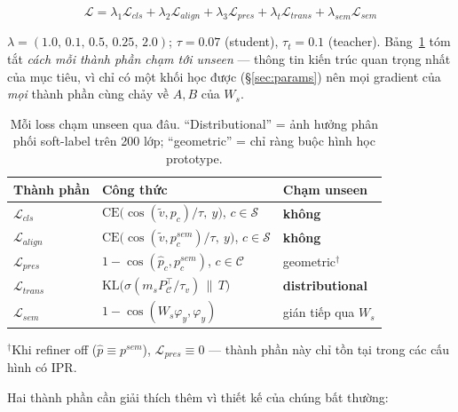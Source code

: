 \documentclass[10pt,twocolumn,letterpaper]{article}
\newcommand{\Seen}{\mathcal{S}}
\newcommand{\All}{\mathcal{C}}
\newcommand{\vtilde}{\tilde{v}}
\newcommand{\phat}{\hat{p}}
\begin{document}
\begin{equation}
\mathcal{L} = \lambda_1\mathcal{L}_{cls}
+ \lambda_2\mathcal{L}_{align}
+ \lambda_3\mathcal{L}_{pres}
+ \lambda_{t}\mathcal{L}_{trans}
+ \lambda_{sem}\mathcal{L}_{sem}
\label{eq:total}
\end{equation}

$\lambda = (1.0,\,0.1,\,0.5,\,0.25,\,2.0)$; $\tau{=}0.07$ (student), $\tau_t{=}0.1$ (teacher). Bảng~\ref{tab:loss-contact} tóm tắt \emph{cách mỗi thành phần chạm tới unseen} — thông tin kiến trúc quan trọng nhất của mục tiêu, vì chỉ có một khối học được (§\ref{sec:params}) nên mọi gradient của \emph{mọi} thành phần cùng chảy về $A,B$ của $W_s$.

\begin{table}[t]
\centering
\caption{Mỗi loss chạm unseen qua đâu. ``Distributional'' = ảnh hưởng phân phối soft-label trên 200 lớp; ``geometric'' = chỉ ràng buộc hình học prototype.}
\label{tab:loss-contact}
\small
\begin{tabular}{lll}
\toprule
Thành phần & Công thức & Chạm unseen \\
\midrule
$\mathcal{L}_{cls}$ & $\mathrm{CE}\big(\cos(\vtilde,p_c)/\tau,\ y\big)$, $c\in\Seen$ & \textbf{không} \\
$\mathcal{L}_{align}$ & $\mathrm{CE}\big(\cos(\vtilde,p^{sem}_c)/\tau,\ y\big)$, $c\in\Seen$ & \textbf{không} \\
$\mathcal{L}_{pres}$ & $1-\cos(\phat_c, p^{sem}_c)$, $c\in\All$ & geometric$^{\dagger}$ \\
$\mathcal{L}_{trans}$ & $\mathrm{KL}\big(\sigma(m_s P_{\All}^{\top}/\tau_v)\,\big\|\,T\big)$ & \textbf{distributional} \\
$\mathcal{L}_{sem}$ & $1-\cos(W_s\varphi_y,\varphi_y)$ & gián tiếp qua $W_s$ \\
\bottomrule
\end{tabular}

\raggedright\footnotesize $^{\dagger}$Khi refiner off ($\phat\equiv p^{sem}$), $\mathcal L_{pres}\equiv 0$ — thành phần này chỉ tồn tại trong các cấu hình có IPR.
\end{table}

Hai thành phần cần giải thích thêm vì thiết kế của chúng bất thường:
\end{document}
